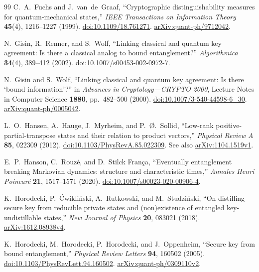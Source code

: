 \begin{thebibliography}{99}
C.~A.~Fuchs and J.~van~de~Graaf,
``Cryptographic distinguishability measures for quantum-mechanical states,''
\emph{IEEE Transactions on Information Theory} \textbf{45}(4), 1216--1227 (1999).
\href{https://doi.org/10.1109/18.761271}{doi:10.1109/18.761271}.
\href{https://arxiv.org/abs/quant-ph/9712042}{arXiv:quant-ph/9712042}.

N.~Gisin, R.~Renner, and S.~Wolf,
``Linking classical and quantum key agreement: Is there a classical analog to bound entanglement?''
\emph{Algorithmica} \textbf{34}(4), 389--412 (2002).
\href{https://doi.org/10.1007/s00453-002-0972-7}{doi:10.1007/s00453-002-0972-7}.

N.~Gisin and S.~Wolf,
``Linking classical and quantum key agreement: Is there `bound information'?''
in \emph{Advances in Cryptology---CRYPTO 2000},
Lecture Notes in Computer Science \textbf{1880}, pp.~482--500 (2000).
\href{https://doi.org/10.1007/3-540-44598-6_30}{doi:10.1007/3-540-44598-6\_30}.
\href{https://arxiv.org/abs/quant-ph/0005042}{arXiv:quant-ph/0005042}.

L.~O.~Hansen, A.~Hauge, J.~Myrheim, and P.~{\O}.~Sollid,
``Low-rank positive-partial-transpose states and their relation to product
vectors,'' \emph{Physical Review A} \textbf{85}, 022309 (2012).
\href{https://doi.org/10.1103/PhysRevA.85.022309}{doi:10.1103/PhysRevA.85.022309}.
See also \href{https://arxiv.org/abs/1104.1519v1}{arXiv:1104.1519v1}.

E.~P.~Hanson, C.~Rouz\'e, and D.~Stilck Fran\c ca,
``Eventually entanglement breaking Markovian dynamics: structure and
characteristic times,''
\emph{Annales Henri Poincar\'e} \textbf{21}, 1517--1571 (2020).
\href{https://doi.org/10.1007/s00023-020-00906-4}{doi:10.1007/s00023-020-00906-4}.

K.~Horodecki, P.~\'Cwikli\'nski, A.~Rutkowski, and M.~Studzi\'nski,
``On distilling secure key from reducible private states and
(non)existence of entangled key-undistillable states,''
\emph{New Journal of Physics} \textbf{20}, 083021 (2018).
\href{https://arxiv.org/abs/1612.08938v4}{arXiv:1612.08938v4}.

K.~Horodecki, M.~Horodecki, P.~Horodecki, and J.~Oppenheim,
``Secure key from bound entanglement,''
\emph{Physical Review Letters} \textbf{94}, 160502 (2005).
\href{https://doi.org/10.1103/PhysRevLett.94.160502}{doi:10.1103/PhysRevLett.94.160502}.
\href{https://arxiv.org/abs/quant-ph/0309110v2}{arXiv:quant-ph/0309110v2}.


\end{thebibliography}
